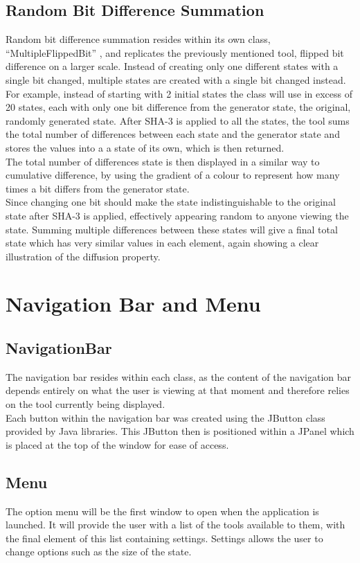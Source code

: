 \subsection{Random Bit Difference Summation}
Random bit difference summation resides within its own class, ``MultipleFlippedBit'' , and replicates the previously mentioned tool, flipped bit difference on a larger scale. Instead of creating only one different states with a single bit changed, multiple states are created with a single bit changed instead. For example, instead of starting with 2 initial states the class will use in excess of 20 states, each with only one bit difference from the generator state, the original, randomly generated state. After SHA-3 is applied to all the states, the tool sums the total number of differences between each state and the generator state and stores the values into a a state of its own, which is then returned. 
\vspace{5mm}\\
The total number of differences state is then displayed in a similar way to cumulative difference, by using the gradient of a colour to represent how many times a bit differs from the generator state.
\vspace{5mm}\\
Since changing one bit should make the state indistinguishable to the original state after SHA-3 is applied, effectively appearing random to anyone viewing the state. Summing multiple differences between these states will give a final total state which has very similar values in each element, again showing a clear illustration of the diffusion property.
\section{Navigation Bar and Menu}
\subsection{NavigationBar}
The navigation bar resides within each class, as the content of the navigation bar depends entirely on what the user is viewing at that moment and therefore relies on the tool currently being displayed.
\vspace{5mm}\\
 Each button within the navigation bar was created using the JButton class provided by Java libraries. This JButton then is positioned within a JPanel which is placed at the top of the window for ease of access.
\subsection{Menu}
The option menu will be the first window to open when the application is launched. It will provide the user with a list of the tools available to them, with the final element of this list containing settings. Settings allows the user to change options such as the size of the state.